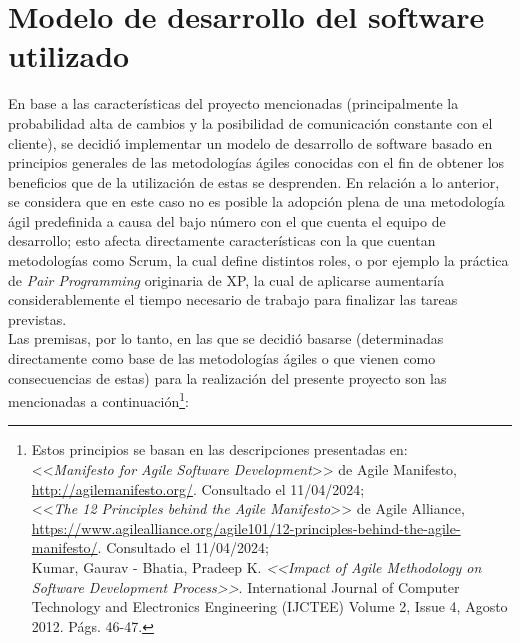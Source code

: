 \documentclass[a4paper, 12pt,twoside]{report}  %
\numberwithin{equation}{subsection} %
\begin{document}
\section{Modelo de desarrollo del software utilizado}
\label{Modelo de desarrollo del software utilizado}
En base a las características del proyecto mencionadas (principalmente la probabilidad alta de cambios y la posibilidad de comunicación constante con el cliente), se decidió implementar un modelo de desarrollo de software basado en principios generales de las metodologías ágiles conocidas con el fin de obtener los beneficios que de la utilización de estas se desprenden. En relación a lo anterior, se considera que en este caso no es posible la adopción plena de una metodología ágil predefinida a causa del bajo número con el que cuenta el equipo de desarrollo; esto afecta directamente características con la que cuentan metodologías como Scrum, la cual define distintos roles, o por ejemplo la práctica de \textit{Pair Programming} originaria de XP, la cual de aplicarse aumentaría considerablemente el tiempo necesario de trabajo para finalizar las tareas previstas.\\
\indent Las premisas, por lo tanto, en las que se decidió basarse (determinadas directamente como base de las metodologías ágiles o que vienen como consecuencias de estas) para la realización del presente proyecto son las mencionadas a continuación\footnote{Estos principios se basan en las descripciones presentadas en:\\ \indent <<\textit{Manifesto for Agile Software Development}>> de Agile Manifesto, \url{http://agilemanifesto.org/}. Consultado el 11/04/2024;\\ \indent <<\textit{The 12 Principles behind the Agile Manifesto}>> de Agile Alliance, \url{https://www.agilealliance.org/agile101/12-principles-behind-the-agile-manifesto/}. Consultado el 11/04/2024;\\
	\indent Kumar, Gaurav - Bhatia, Pradeep K. \textit{<<Impact of Agile Methodology on Software Development Process>>}. International Journal of Computer Technology and Electronics Engineering (IJCTEE)
	Volume 2, Issue 4, Agosto 2012. Págs. 46-47.}:
\end{document}
